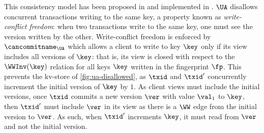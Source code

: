 This consistency model has been proposed in \citet{framework-concur} 
and implemented in \citet{rola}.
\(\UA\) disallows concurrent transactions writing to the same key,
a property known as \emph{write-conflict freedom}:  
when two transactions write to the same key, one must see the version 
written by the other.
Write-conflict freedom is enforced by \(\cancommitname_{\UA}\) which
allows a client to write to key \(\key\) only if its view includes all
versions of \(\key\): that is,  its view is closed with respect to the \(\WWInv(\key)\) relation for all keys \(\key\) written in the fingerprint \(\fp\).
This prevents the kv-store of \cref{fig:ua-disallowed},
as \(\txid\) and \(\txid'\) concurrently increment the initial version of \(\key\) by \(1\).
As client views must include the initial versions, once \(\txid\) commits a new version \(\ver\) with value \(\val_1\) to \(\key\), then \(\txid'\) must include \(\ver\) in its view as there is a \(\WW\) edge from the initial version to \(\ver\). 
As such, when \(\txid'\) increments \(\key\), it must read from \(\ver\) and not the initial version.%

